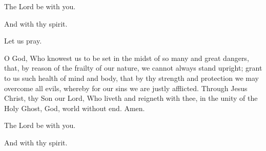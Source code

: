 



\rubric{\Vbar}The Lord be with you.

\rubric{\Rbar}And with thy spirit.

Let us pray.

O God, Who knowest us to be set in the midst of so many and great dangers, that, by reason of the frailty of our nature, we cannot always stand upright; grant to us such health of mind and body, that by thy strength and protection we may overcome all evils, whereby for our sins we are justly afflicted. Through Jesus Christ, thy Son our Lord, Who liveth and reigneth with thee, in the unity of the Holy Ghost, God, world without end. \rubric{\Rbar} Amen.

\rubric{\Vbar}The Lord be with you.

\rubric{\Rbar}And with thy spirit.